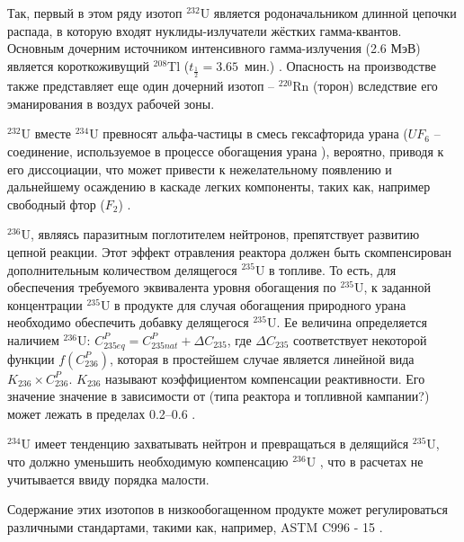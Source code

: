 Так, первый в этом ряду изотоп $^{232}$U является родоначальником длинной цепочки распада, в которую входят нуклиды-излучатели жёстких гамма-квантов.
Основным дочерним источником интенсивного гамма-излучения (2.6 МэВ) является короткоживущий $^{208}$Tl ($t_{\frac{1}{2}}=3.65$ мин.) \cite{matveevUran232EgoVliyanie1985,abbasProliferationResistanceFeatures2013}. Опасность на производстве также представляет еще один дочерний изотоп -- $^{220}$Rn (торон) вследствие его эманирования в воздух рабочей зоны.

$^{232}$U вместе $^{234}$U превносят альфа-частицы в смесь гексафторида урана ($UF_6$ -- соединение, используемое в процессе обогащения урана \cite{orlovWayObtainUranium2015, orlovDesublimationPurificationTransporting2017}), вероятно, приводя к его диссоциации, что может привести к нежелательному появлению и дальнейшему осаждению в каскаде легких компоненты, таких как, например свободный фтор ($F_2$) \cite{kryuchkovObogashchennyyUranDobavleniem2007, bernhardtRadiationEffectsAlpha1958, shmelevRazrabotkaRaschetnoyModeli2012}.

$^{236}$U, являясь паразитным поглотителем нейтронов, препятствует развитию цепной реакции.
Этот эффект отравления реактора должен быть скомпенсирован дополнительным количеством делящегося $^{235}$U в топливе.
То есть, для обеспечения требуемого эквивалента уровня обогащения по $^{235}$U, к заданной концентрации $^{235}$U в продукте для случая обогащения природного урана необходимо обеспечить добавку делящегося $^{235}$U.
Ее величина определяется наличием $^{236}$U:
$C_{235 e q}^{P}=C_{235 n a t}^{P}+\Delta C_{235}$, где $\Delta C_{235}$ соответствует некоторой функции $f\left(C_{236}^{P}\right)$, которая в простейшем случае является линейной вида $K_{236} \times C_{236}^{P}$. $K_{236}$ называют коэффициентом компенсации реактивности. Его значение значение в зависимости от (типа реактора и топливной кампании?) может лежать в пределах 0.2--0.6 \cite{delagarzaMulticomponentIsotopeSeparation1961, delculAnalysisReuseUranium2009}. 

$^{234}$U имеет тенденцию захватывать нейтрон и превращаться в делящийся $^{235}$U, что должно уменьшить необходимую компенсацию $^{236}$U \cite{dyachenkoIspolzovanieRegenerirovannogoUrana2012}, что в расчетах не учитывается ввиду порядка малости.

Содержание этих изотопов в низкообогащенном продукте может регулироваться различными стандартами, такими как, например, ASTM C996 - 15 \cite{c26committeeSpecificationUraniumHexafluoride}.

